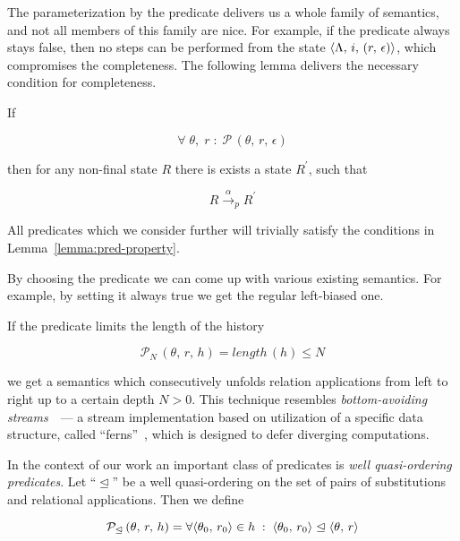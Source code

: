 The parameterization by the predicate delivers us a whole family of semantics, and not all members of this family are nice. For example,
if the predicate always stays false, then no steps can be performed from the state $\langle \Lambda,\, i, \, (r,\, \epsilon) \rangle$, which compromises the completeness.
The following lemma delivers the necessary condition for completeness.

\begin{lemma}
\label{lemma:pred-property}
If

\[
\forall\;\theta,\;r\; :\;\mathcal{P}\,(\theta,\, r,\, \epsilon)
\]

then for any non-final state $R$ there is exists a state $R^\prime$, such that

\[
R \xrightarrow{\alpha}_p R^\prime
\]
\end{lemma}

All predicates which we consider further will trivially satisfy the conditions in Lemma~\ref{lemma:pred-property}.

By choosing the predicate we can come up with various existing semantics. For example, by setting it always true we get the regular left-biased one.

If the predicate limits the length of the history

\[
\mathcal{P}_N\,(\theta,\, r,\, h) = length\,(h) \leq N
\]

we get a semantics which consecutively unfolds relation applications from left to right up to a certain depth $N>0$. This technique resembles \emph{bottom-avoiding
streams}~\cite{fair:WillThesis}~--- a stream implementation based on utilization of a specific data structure, called ``ferns''~\cite{fair:ferns}, which is designed
to defer diverging computations.

In the context of our work an important class of predicates is \emph{well quasi-ordering predicates}. Let ``$\trianglelefteq$'' be a well quasi-ordering on the set of
pairs of substitutions and relational applications. Then we define

\[
\mathcal{P}_\trianglelefteq\,(\theta,\,r,\,h) = \forall\langle \theta_0,\,r_0 \rangle\in h\;:\; \langle \theta_0,\,r_0 \rangle\trianglelefteq \langle \theta,\,r \rangle
\]

